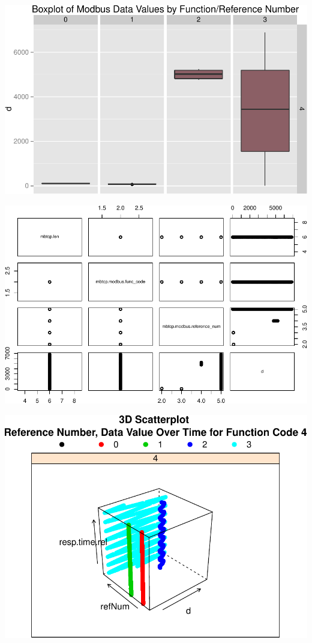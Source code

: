 \documentclass[]{article}
\begin{document}
\pagebreak

\includegraphics{modbus_files/figure-latex/unnamed-chunk-22-1.pdf}

\includegraphics{modbus_files/figure-latex/unnamed-chunk-23-1.pdf}

\includegraphics{modbus_files/figure-latex/unnamed-chunk-24-1.pdf}
\end{document}
